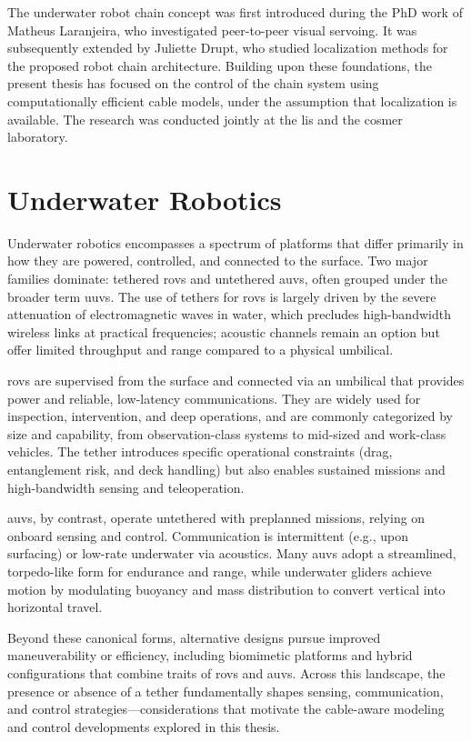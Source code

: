 The underwater robot chain concept was first introduced during the PhD work of Matheus Laranjeira,
who investigated peer-to-peer visual servoing. It was subsequently extended by Juliette Drupt, who
studied localization methods for the proposed robot chain architecture. Building upon these
foundations, the present thesis has focused on the control of the chain system using
computationally efficient cable models, under the assumption that localization is available. The
research was conducted jointly at the \ac{lis} and the \ac{cosmer} laboratory.

\section{Underwater Robotics}
\label{i_underwater_robotics}

Underwater robotics encompasses a spectrum of platforms that differ primarily in how they are
powered, controlled, and connected to the surface. Two major families dominate: tethered \acp{rov}
and untethered \acp{auv}, often grouped under the broader term \acp{uuv}. The use of tethers for
\acp{rov} is largely driven by the severe attenuation of electromagnetic waves in water, which
precludes high-bandwidth wireless links at practical frequencies; acoustic channels remain an
option but offer limited throughput and range compared to a physical umbilical.

\Acp{rov} are supervised from the surface and connected via an umbilical that provides power and
reliable, low-latency communications. They are widely used for inspection, intervention, and deep
operations, and are commonly categorized by size and capability, from observation-class systems to
mid-sized and work-class vehicles. The tether introduces specific
operational constraints (drag, entanglement risk, and deck handling) but also enables sustained
missions and high-bandwidth sensing and teleoperation.

\Acp{auv}, by contrast, operate untethered with preplanned missions, relying on onboard sensing and control.
Communication is intermittent (e.g., upon surfacing) or low-rate underwater via acoustics. Many
\acp{auv} adopt a streamlined, torpedo-like form for endurance and range, while underwater gliders
achieve motion by modulating buoyancy and mass distribution to convert vertical into horizontal
travel.

Beyond these canonical forms, alternative designs pursue improved maneuverability or efficiency,
including biomimetic platforms and hybrid configurations that combine traits of \acp{rov} and
\acp{auv}. Across this landscape, the presence or absence of a tether fundamentally shapes sensing,
communication, and control strategies—considerations that motivate the cable-aware modeling and
control developments explored in this thesis.

